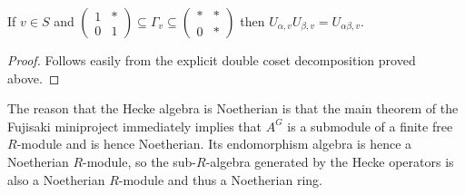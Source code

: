 \begin{lemma}
  \label{nolean-product-of-U-alpha}
  If $v\in S$ and $\begin{pmatrix}1&*\\0&1\end{pmatrix}\subseteq\Gamma_v\subseteq\begin{pmatrix}*&*\\0&*\end{pmatrix}$
  then $U_{\alpha,v}U_{\beta,v}=U_{\alpha\beta,v}$.
\end{lemma}
\begin{proof} Follows easily from the explicit double coset decomposition proved above.
\end{proof}

The reason that the Hecke algebra is Noetherian is that the main theorem of the Fujisaki
miniproject immediately implies that $A^G$ is a submodule of a finite free $R$-module
and is hence Noetherian. Its endomorphism algebra is hence a Noetherian $R$-module,
so the sub-$R$-algebra generated by the Hecke operators is also a Noetherian $R$-module
and thus a Noetherian ring.
